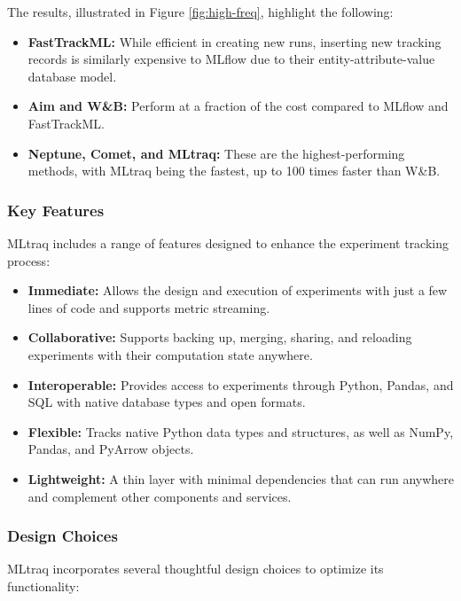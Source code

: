 The results, illustrated in Figure \ref{fig:high-freq}, highlight the following:

\begin{itemize}
    \item \textbf{FastTrackML:} While efficient in creating new runs, inserting new tracking records is similarly expensive to MLflow due to their entity-attribute-value database model.
    \item \textbf{Aim and W\&B:} Perform at a fraction of the cost compared to MLflow and FastTrackML.
    \item \textbf{Neptune, Comet, and MLtraq:} These are the highest-performing methods, with MLtraq being the fastest, up to 100 times faster than W\&B.\newline
\end{itemize}

\subsubsection{Key Features}

MLtraq includes a range of features designed to enhance the experiment tracking process:

\begin{itemize}
    \item \textbf{Immediate:} Allows the design and execution of experiments with just a few lines of code and supports metric streaming.
    \item \textbf{Collaborative:} Supports backing up, merging, sharing, and reloading experiments with their computation state anywhere.
    \item \textbf{Interoperable:} Provides access to experiments through Python, Pandas, and SQL with native database types and open formats.
    \item \textbf{Flexible:} Tracks native Python data types and structures, as well as NumPy, Pandas, and PyArrow objects.
    \item \textbf{Lightweight:} A thin layer with minimal dependencies that can run anywhere and complement other components and services.
\end{itemize}

\subsubsection{Design Choices}

MLtraq incorporates several thoughtful design choices to optimize its functionality:

